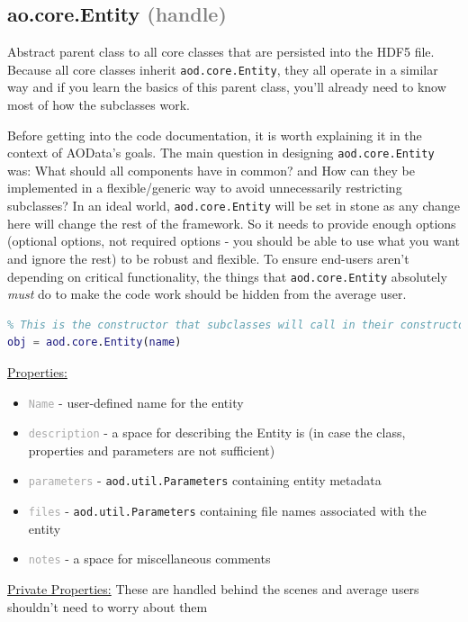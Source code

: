 \documentclass[10pt]{exam}
\newcommand\aodclass[1]{\textcolor{codeblue}{\texttt{#1}}}
\newcommand\aodprop[1]{\textcolor{darkgray}{\texttt{#1}}}
\newcommand\docheader[1]{\vspace{0.6ex}\noindent\underline{#1}\vspace{0.15ex}}
\begin{document}
	\subsection{ao.core.Entity \textcolor{gray}{(handle)}}
		\label{subsection:EntityDoc}
		\noindent  Abstract parent class to all core classes that are persisted into the HDF5 file. Because all core classes inherit \aodclass{aod.core.Entity}, they all operate in a similar way and if you learn the basics of this parent class, you'll already need to know most of how the subclasses work.
		
		Before getting into the code documentation, it is worth explaining it in the context of AOData's goals. The main question in designing \aodclass{aod.core.Entity} was: What should all components have in common? and How can they be implemented in a flexible/generic way to avoid unnecessarily restricting subclasses? In an ideal world, \aodclass{aod.core.Entity} will be set in stone as any change here will change the rest of the framework. So it needs to provide enough options (optional options, not required options - you should be able to use what you want and ignore the rest) to be robust and flexible. To ensure end-users aren't depending on critical functionality, the things that \aodclass{aod.core.Entity} absolutely \textit{must} do to make the code work should be hidden from the average user.  
		\begin{lstlisting}[language=matlab]
% Note that aod.core.Entity is abstract and never directly instantiated.
% This is the constructor that subclasses will call in their constructors
obj = aod.core.Entity(name)
		\end{lstlisting}
		\docheader{Properties:} 
		\begin{itemize}
			\item \aodprop{Name} - user-defined name for the entity
			\item \aodprop{description} - a space for describing the Entity is (in case the class, properties and parameters are not sufficient)
			\item \aodprop{parameters} - \aodclass{aod.util.Parameters} containing entity metadata
			\item \aodprop{files} - \aodclass{aod.util.Parameters} containing file names associated with the entity
			\item \aodprop{notes} - a space for miscellaneous comments
		\end{itemize}
		\docheader{Private Properties:} These are handled behind the scenes and average users shouldn't need to worry about them
\end{document}
